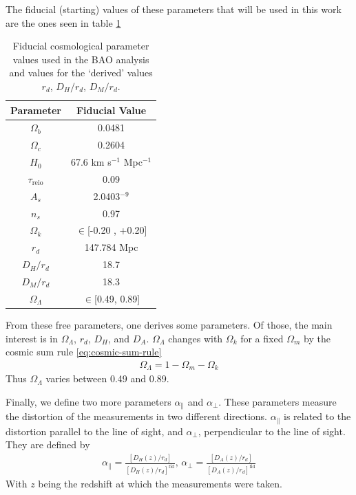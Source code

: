 The fiducial (starting) values of these parameters that will be used in this work are the ones seen in table \ref{tab:fid-values}
\begin{table}[t]
\begin{center}
\begin{tabular}{|c|c|}
\hline
Parameter & Fiducial Value \\
\hline
$\Omega_b$ & 0.0481 \\
$\Omega_c$ & 0.2604 \\
$H_0$ & 67.6 km s$^{-1}$ Mpc$^{-1}$ \\
$\tau_{\text{reio}}$ & 0.09 \\
$A_s$ & 2.0403\cdot 10$^{-9}$ \\
$n_s$ & 0.97 \\
$\Omega_k$ & $\in$[-0.20 , +0.20]  \\
\hline
\hline
$r_d$ & 147.784 Mpc \\
$D_H/r_d$ & 18.7 \\
$D_M/r_d$ & 18.3 \\
$\Omega_\Lambda$ & $\in$[0.49, 0.89] \\
\hline
\end{tabular}
\end{center}
\caption{Fiducial cosmological parameter values used in the BAO analysis and values for the `derived' values $r_d$, $D_H / r_d$, $D_M /r_d$.}
\label{tab:fid-values}
\end{table}
From these free parameters, one derives some parameters. Of those, the main interest is in $\Omega_\Lambda$, $r_d$, $D_H$, and $D_A$. $\Omega_\Lambda$ changes with $\Omega_k$ for a fixed $\Omega_m$ by the cosmic sum rule \eqref{eq:cosmic-sum-rule}
\begin{align}
	\Omega_\Lambda =  1 - \Omega_m - \Omega_k
\end{align}
Thus $\Omega_\Lambda$ varies between 0.49 and 0.89.

Finally, we define two more parameters $\alpha_\parallel$ and $\alpha_\perp$. These parameters measure the distortion of the measurements in two different directions. $\alpha_\parallel$ is related to the distortion parallel to the line of sight, and  $\alpha_\perp$, perpendicular to the line of sight. They are defined by 
\begin{align}
	\alpha_\parallel = \frac{\left[ D_H(z) /r_d \right] }{\left[ D_H(z)/r_d \right]^{\text{fid}} }, \, \alpha_\perp = \frac{\left[ D_A(z) /r_d \right] }{\left[ D_A(z)/r_d \right]^{\text{fid}} }
	\label{eq:alphas-def}
\end{align}
With $z$ being the redshift at which the measurements were taken.

